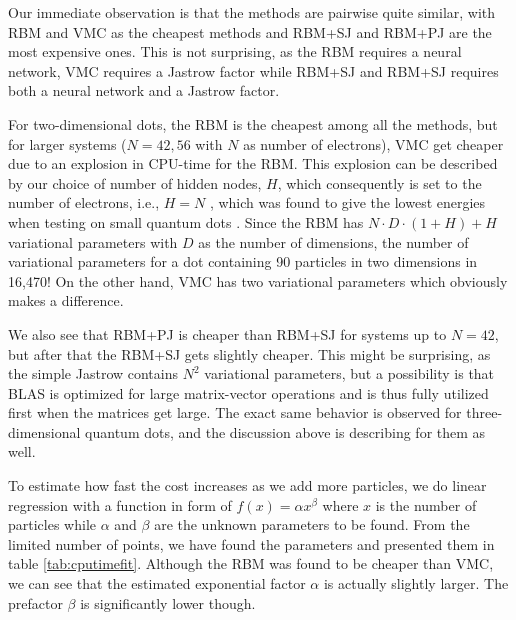 Our immediate observation is that the methods are pairwise quite similar, with RBM and VMC as the cheapest methods and RBM+SJ and RBM+PJ are the most expensive ones. This is not surprising, as the RBM requires a neural network, VMC requires a Jastrow factor while RBM+SJ and RBM+SJ requires both a neural network and a Jastrow factor. 

For two-dimensional dots, the RBM is the cheapest among all the methods, but for larger systems ($N=42,56$ with $N$ as number of electrons), VMC get cheaper due to an explosion in CPU-time for the RBM. This explosion can be described by our choice of number of hidden nodes, $H$, which consequently is set to the number of electrons, i.e., $H=N$ , which was found to give the lowest energies when testing on small quantum dots \cite{nordhagen_computational_2018}. Since the RBM has $N\cdot D\cdot (1+H)+H$ variational parameters with $D$ as the number of dimensions, the number of variational parameters for a dot containing 90 particles in two dimensions in 16,470! On the other hand, VMC has two variational parameters which obviously makes a difference. 

We also see that RBM+PJ is cheaper than RBM+SJ for systems up to $N=42$, but after that the RBM+SJ gets slightly cheaper. This might be surprising, as the simple Jastrow contains $N^2$ variational parameters, but a possibility is that BLAS is optimized for large matrix-vector operations and is thus fully utilized first when the matrices get large. The exact same behavior is observed for three-dimensional quantum dots, and the discussion above is describing for them as well.

To estimate how fast the cost increases as we add more particles, we do linear regression with a function in form of $f(x)=\alpha x^{\beta}$ where $x$ is the number of particles while $\alpha$ and $\beta$ are the unknown parameters to be found. From the limited number of points, we have found the parameters and presented them in table \eqref{tab:cputimefit}. Although the RBM was found to be cheaper than VMC, we can see that the estimated exponential factor $\alpha$ is actually slightly larger. The prefactor $\beta$ is significantly lower though.

